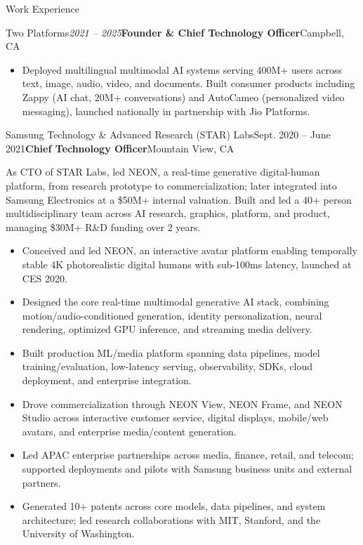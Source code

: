 \documentclass[
	10pt, %
]{resume} %
\begin{document}
\begin{rSection}{Work Experience}
\begin{rSubsection}{Two Platforms}{\textit{2021 -- 2025}}{\textbf{Founder \& Chief Technology Officer}}{Campbell, CA}
\begin{itemize}
\item Deployed multilingual multimodal AI systems serving 400M+ users across text, image, audio, video, and documents. Built consumer products including Zappy (AI chat, 20M+ conversations) and AutoCameo (personalized video messaging), launched nationally in partnership with Jio Platforms.


\end{itemize}
	\end{rSubsection}



\begin{rSubsection}{Samsung Technology \& Advanced Research (STAR) Labs}{Sept. 2020 -- June 2021}{\textbf{Chief Technology Officer}}{Mountain View, CA}
\item[]As CTO of STAR Labs, led NEON, a real-time generative digital-human platform, from research prototype to commercialization; later integrated into Samsung Electronics at a \$50M+ internal valuation. Built and led a 40+ person multidisciplinary team across AI research, graphics, platform, and product, managing \$30M+ R\&D funding over 2 years.

\begin{itemize}
\item Conceived and led NEON, an interactive avatar platform enabling temporally stable 4K photorealistic digital humans with sub-100ms latency, launched at CES 2020.
\item Designed the core real-time multimodal generative AI stack, combining motion/audio-conditioned generation, identity personalization, neural rendering, optimized GPU inference, and streaming media delivery.
\item Built production ML/media platform spanning data pipelines, model training/evaluation, low-latency serving, observability, SDKs, cloud deployment, and enterprise integration.
\item Drove commercialization through NEON View, NEON Frame, and NEON Studio across interactive customer service, digital displays, mobile/web avatars, and enterprise media/content generation.
\item Led APAC enterprise partnerships across media, finance, retail, and telecom; supported deployments and pilots with Samsung business units and external partners.
\item Generated 10+ patents across core models, data pipelines, and system architecture; led research collaborations with MIT, Stanford, and the University of Washington.
\end{itemize}
\end{rSubsection}



\end{rSection}
\end{document}
